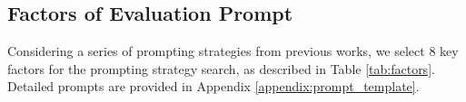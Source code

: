 \subsection{Factors of Evaluation Prompt}

\label{factors}

Considering a series of prompting strategies from previous works, we select 8 key factors for the prompting strategy search, as described in Table \ref{tab:factors}. Detailed prompts are provided in Appendix \ref{appendix:prompt_template}.









